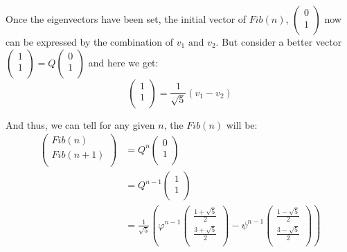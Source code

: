\documentclass[utf-8]{article}
\begin{document}
Once the eigenvectors have been set, the initial vector of $Fib(n)$, $
\begin{pmatrix}
  0 \\
  1 \\
\end{pmatrix}
$ now can be expressed by the combination of $v_1 \mbox{ and }v_2$.
But consider a better vector $
\begin{pmatrix}
  1 \\
  1 \\
\end{pmatrix}= Q
\begin{pmatrix}
  0 \\
  1 \\
\end{pmatrix}
$
and here we get:
\[
  \begin{pmatrix}
    1 \\
    1 \\
  \end{pmatrix}=\frac{1}{\sqrt{5}}\left(v_1-v_2\right)
\]

And thus, we can tell for any given $n$, the $Fib(n)$ will be:
\begin{align*}
  \begin{pmatrix}
    Fib(n)   \\
    Fib(n+1) \\
  \end{pmatrix} &= Q^n
                  \begin{pmatrix}
                    0 \\
                    1 \\
                  \end{pmatrix} \\
                &= Q^{n-1}
                  \begin{pmatrix}
                    1 \\
                    1 \\
                  \end{pmatrix} \\
                &= \frac{1}{\sqrt{5}}\left(\varphi^{n-1}
                  \begin{pmatrix}
                   \frac{1+\sqrt{5}}{2} \\
                   \frac{3+\sqrt{5}}{2} \\
                  \end{pmatrix} - \psi^{n-1}
                  \begin{pmatrix}
                   \frac{1-\sqrt{5}}{2} \\
                   \frac{3-\sqrt{5}}{2} \\
                  \end{pmatrix}
                  \right)
\end{align*}
\end{document}
